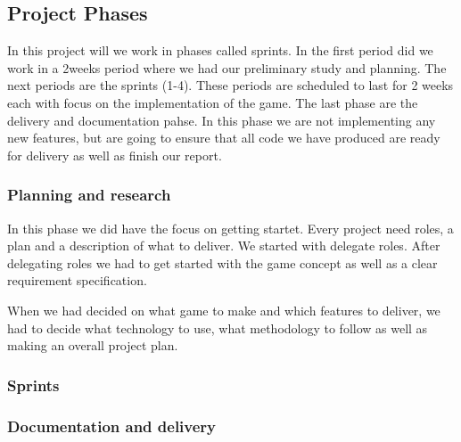 \subsection{Project Phases}

In this project will we work in phases called sprints.
In the first period did we work in a 2weeks period where we had our preliminary study and planning. The next periods are the sprints (1-4). These periods are scheduled to last for 2 weeks each with focus on the implementation of the game. The last phase are the delivery and documentation pahse. In this phase we are not implementing any new features, but are going to ensure that all code we have produced are ready for delivery as well as finish our report.

\subsubsection{Planning and research}
In this phase we did have the focus on getting startet. Every project need roles, a plan and a description of what to deliver. We started with delegate roles. After delegating roles we had to get started with the game concept as well as a clear requirement specification. 

When we had decided on what game to make and which features to deliver, we had to decide what technology to use, what methodology to follow as well as making an overall project plan. 

\subsubsection{Sprints}
\subsubsection{Documentation and delivery}